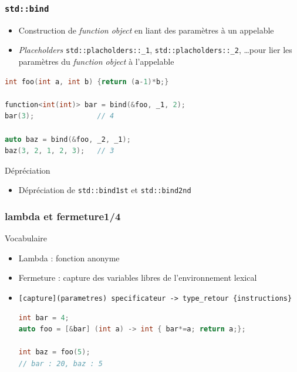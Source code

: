 \documentclass[C++.tex]{subfiles}
\begin{document}
\begin{frame}[fragile]
	\frametitle{\lstinline|std::bind|}
	\begin{itemize}
		\item Construction de \textit{function object} en liant des paramètres à un appelable
		\item \textit{Placeholders} \lstinline|std::placholders::_1|, \lstinline|std::placholders::_2|, \ldots pour lier les paramètres du \textit{function object} à l'appelable
	\end{itemize}

	\begin{lstlisting}[language=C++]
int foo(int a, int b) {return (a-1)*b;}

function<int(int)> bar = bind(&foo, _1, 2);
bar(3);               // 4

auto baz = bind(&foo, _2, _1);
baz(3, 2, 1, 2, 3);   // 3\end{lstlisting}	


	\begin{block}{Dépréciation}
		\begin{itemize}
			\item Dépréciation de \lstinline|std::bind1st| et \lstinline|std::bind2nd|
		\end{itemize}

	\end{block}
\end{frame}

\begin{frame}[fragile]
	\frametitle{lambda et fermeture\titlehfill{}1/4}
	\begin{block}{Vocabulaire}
		\begin{itemize}
			\item Lambda : fonction anonyme
			\item Fermeture : capture des variables libres de l'environnement lexical
		\end{itemize}
	\end{block}

	\pause

	\begin{itemize}
		\item \lstinline|[capture](parametres) specificateur -> type_retour {instructions}|

		\begin{lstlisting}[language=C++]
int bar = 4;
auto foo = [&bar] (int a) -> int { bar*=a; return a;};

int baz = foo(5);
// bar : 20, baz : 5\end{lstlisting}
	\end{itemize}
\end{frame}
\end{document}
